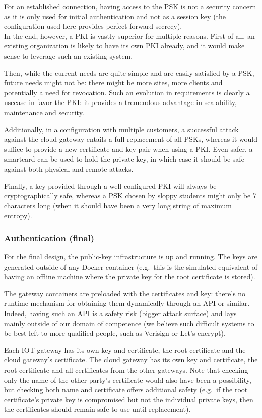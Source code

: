 \documentclass[paper=a4, fontsize=11pt]{scrartcl}
\begin{document}
For an established connection, having access to the PSK is not a security
concern as it is only used for initial authentication and not as a session key
(the configuration used here provides perfect forward secrecy).\\

In the end, however, a PKI is vastly superior for multiple reasons.
First of all, an existing organization is likely to have its own PKI already,
and it would make sense to leverage such an existing system.

Then, while the current needs are quite simple and are easily satisfied by a
PSK, future needs might not be: there might be more sites, more clients and
potentially a need for revocation.
Such an evolution in requirements is clearly a usecase in favor the PKI\@: it
provides a tremendous advantage in scalability, maintenance and security.

Additionally, in a configuration with multiple customers, a successful attack
against the cloud gateway entails a full replacement of all PSKs, whereas it
would suffice to provide a new certificate and key pair when using a PKI\@.
Even safer, a smartcard can be used to hold the private key, in which case it
should be safe against both physical and remote attacks.

Finally, a key provided through a well configured PKI will always be
cryptographically safe, whereas a PSK chosen by sloppy students might only be 7
characters long (when it should have been a very long string of maximum
entropy).

\subsubsection{Authentication (final)}

For the final design, the public-key infrastructure is up and running.
The keys are generated outside of any Docker container (e.g.\ this is the
simulated equivalent of having an offline machine where the private key for the
root certificate is stored).

The gateway containers are preloaded with the certificates and key: there's no
runtime mechanism for obtaining them dynamically through an API or similar.
Indeed, having such an API is a safety risk (bigger attack surface) and lays
mainly outside of our domain of competence (we believe such difficult systems to
be best left to more qualified people, such as Verisign or Let's encrypt).

Each IOT gateway has its own key and certificate, the root certificate and the
cloud gateway's certificate.
The cloud gateway has its own key and certificate, the root certificate and all
certificates from the other gateways.
Note that checking only the name of the other party's certificate would also
have been a possibility, but checking both name and certificate offers
additional safety (e.g.\ if the root certificate's private key is compromised
but not the individual private keys, then the certificates should remain safe to
use until replacement).\\
\end{document}
